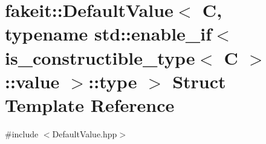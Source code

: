 \hypertarget{structfakeit_1_1DefaultValue_3_01C_00_01typename_01std_1_1enable__if_3_01is__constructible__typeba4172eb6f54b4f010948e5b77fe8b8f}{}\section{fakeit\+::Default\+Value$<$ C, typename std\+::enable\+\_\+if$<$ is\+\_\+constructible\+\_\+type$<$ C $>$\+::value $>$\+::type $>$ Struct Template Reference}
\label{structfakeit_1_1DefaultValue_3_01C_00_01typename_01std_1_1enable__if_3_01is__constructible__typeba4172eb6f54b4f010948e5b77fe8b8f}


{\ttfamily \#include $<$Default\+Value.\+hpp$>$}

